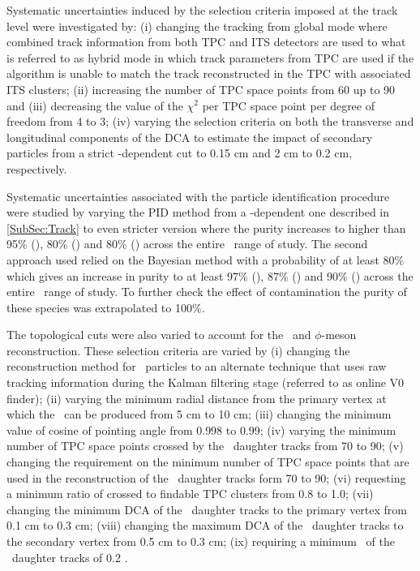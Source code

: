 Systematic uncertainties induced by the selection criteria imposed at the track level were investigated by: (i) changing the tracking from global mode where combined track information from both TPC and ITS detectors are used to what is referred to as hybrid mode in which track parameters from TPC are used if the algorithm is unable to match the track reconstructed in the TPC with associated ITS clusters; (ii) increasing the number of TPC space points from 60 up to 90 and (iii) decreasing the value of the $\chi^{2}$ per TPC space point per degree of freedom from 4 to 3; (iv) varying the selection criteria on both the transverse and longitudinal components of the DCA to estimate the impact of secondary particles from a strict \pT-dependent cut to 0.15 cm and 2 cm to 0.2 cm, respectively.



Systematic uncertainties associated with the particle identification procedure were studied by varying the PID method from a \pT-dependent one described in \ref{SubSec:Track} to even stricter version where the purity increases to higher than 95\% (\pion), 80\% (\kaon) and 80\% (\proton) across the entire \pT~range of study. The second approach used relied on the Bayesian method with a probability of at least 80\% which gives an increase in purity to at least 97\% (\pion), 87\% (\kaon) and 90\% (\proton) across the entire \pT~range of study. To further check the effect of contamination the purity of these species was extrapolated to 100\%. 

The topological cuts were also varied to account for the \vo~and $\phi$-meson reconstruction. These selection criteria are varied by 
(i) changing the reconstruction method for  \vo~particles to an alternate technique that uses raw tracking information during the Kalman filtering stage (referred to as online V0 finder); (ii) varying the minimum radial distance from the primary vertex at which the \vo~can be produced from 5 cm to 10 cm; (iii) changing the minimum value of cosine of pointing angle from 0.998 to 0.99; (iv) varying the minimum number of TPC space points crossed by the \vo~daughter tracks from 70 to 90; (v) changing the requirement on the minimum number of TPC space points that are used in the reconstruction of the \vo~daughter tracks form 70 to 90; (vi) requesting a minimum ratio of crossed to findable TPC clusters from 0.8 to 1.0; (vii) changing the minimum DCA of the \vo~daughter tracks to the primary vertex from 0.1 cm to 0.3 cm; (viii) changing the maximum DCA of the \vo~daughter tracks to the secondary vertex from 0.5 cm to 0.3 cm; (ix) requiring a minimum \pT~of the \vo~daughter tracks of 0.2 \GeV. 

